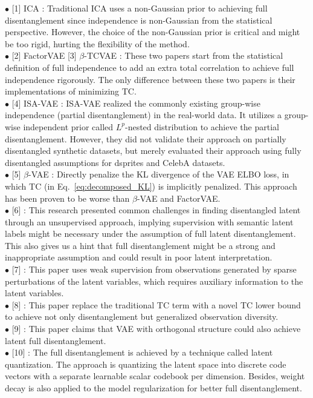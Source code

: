 $\bullet$ [1] ICA \citep{hyvarinen2000independent}: Traditional ICA uses a non-Gaussian prior to achieving full disentanglement since independence is non-Gaussian from the statistical perspective. However, the choice of the non-Gaussian prior is critical and might be too rigid, hurting the flexibility of the method. \\
$\bullet$ [2] FactorVAE \citep{kim2018disentangling} [3] $\beta$-TCVAE \citep{chen2018isolating}: These two papers start from the statistical definition of full independence to add an extra total correlation to achieve full independence rigorously. The only difference between these two papers is their implementations of minimizing TC. \\
$\bullet$ [4] ISA-VAE \citep{stuhmer2020independent}: ISA-VAE realized the commonly existing group-wise independence (partial disentanglement) in the real-world data. It utilizes a group-wise independent prior called $L^p$-nested distribution to achieve the partial disentanglement. However, they did not validate their approach on partially disentangled synthetic datasets, but merely evaluated their approach using fully disentangled assumptions for dsprites and CelebA datasets. \\
$\bullet$ [5] $\beta$-VAE \citep{burgess2018understanding}: Directly penalize the KL divergence of the VAE ELBO loss, in which TC (in Eq.~\eqref{eq:decomposed_KL}) is implicitly penalized. This approach has been proven to be worse than $\beta$-VAE and FactorVAE. \\
$\bullet$ [6] \citep{locatello2019challenging}: This research presented common challenges in finding disentangled latent through an unsupervised approach, implying supervision with semantic latent labels might be necessary under the assumption of full latent disentanglement. This also gives us a hint that full disentanglement might be a strong and inappropriate assumption and could result in poor latent interpretation. \\
$\bullet$ [7] \citep{ahuja2022weakly}: This paper uses weak supervision from observations generated by sparse perturbations of the latent variables, which requires auxiliary information to the latent variables. \\
$\bullet$ [8] \citep{meo2024alpha}: This paper replace the traditional TC term with a novel TC lower bound to achieve not only disentanglement but generalized observation diversity. \\
$\bullet$ [9] \citep{bhowalvariational}: This paper claims that VAE with orthogonal structure could also achieve latent full disentanglement. \\
$\bullet$ [10] \citep{hsu2024disentanglement}: The full disentanglement is achieved by a technique called latent quantization. The approach is quantizing the latent space into discrete code vectors with a separate learnable scalar codebook per dimension. Besides, weight decay is also applied to the model regularization for better full disentanglement.

\clearpage
